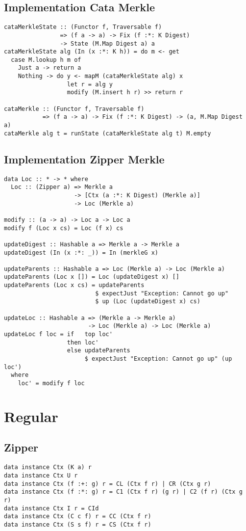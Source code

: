 \section{Implementation Cata Merkle}
\label{app-impl-cata-merkle}
\begin{verbatim}
cataMerkleState :: (Functor f, Traversable f)
                => (f a -> a) -> Fix (f :*: K Digest) 
                -> State (M.Map Digest a) a
cataMerkleState alg (In (x :*: K h)) = do m <- get
  case M.lookup h m of
    Just a -> return a
    Nothing -> do y <- mapM (cataMerkleState alg) x
                  let r = alg y
                  modify (M.insert h r) >> return r

cataMerkle :: (Functor f, Traversable f)
           => (f a -> a) -> Fix (f :*: K Digest) -> (a, M.Map Digest a)
cataMerkle alg t = runState (cataMerkleState alg t) M.empty
\end{verbatim}

\section{Implementation Zipper Merkle}
\label{app-impl-zipper-merkle}
\begin{verbatim}
data Loc :: * -> * where
  Loc :: (Zipper a) => Merkle a 
                    -> [Ctx (a :*: K Digest) (Merkle a)] 
                    -> Loc (Merkle a)

modify :: (a -> a) -> Loc a -> Loc a
modify f (Loc x cs) = Loc (f x) cs

updateDigest :: Hashable a => Merkle a -> Merkle a
updateDigest (In (x :*: _)) = In (merkleG x)

updateParents :: Hashable a => Loc (Merkle a) -> Loc (Merkle a)
updateParents (Loc x []) = Loc (updateDigest x) []
updateParents (Loc x cs) = updateParents
                          $ expectJust "Exception: Cannot go up"
                          $ up (Loc (updateDigest x) cs)

updateLoc :: Hashable a => (Merkle a -> Merkle a) 
                        -> Loc (Merkle a) -> Loc (Merkle a)
updateLoc f loc = if   top loc'
                  then loc'
                  else updateParents 
                       $ expectJust "Exception: Cannot go up" (up loc')
  where
    loc' = modify f loc
\end{verbatim}

\chapter{Regular}

\section{Zipper}
\begin{verbatim}
data instance Ctx (K a) r
data instance Ctx U r
data instance Ctx (f :+: g) r = CL (Ctx f r) | CR (Ctx g r)
data instance Ctx (f :*: g) r = C1 (Ctx f r) (g r) | C2 (f r) (Ctx g r)
data instance Ctx I r = CId
data instance Ctx (C c f) r = CC (Ctx f r)
data instance Ctx (S s f) r = CS (Ctx f r)
\end{verbatim}